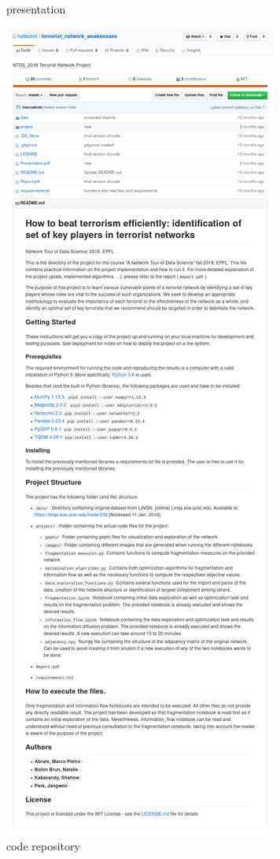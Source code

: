 \documentclass[aspectratio=169]{beamer}
\begin{document}
\begin{frame}
\begin{minipage}[t]{0.45\linewidth}
\begin{figure}
			\caption*{\color{darkred} presentation}
		\end{figure}
	\end{minipage}
	\hfill
	\begin{minipage}[t]{0.45\linewidth}
		\begin{figure}
			\includegraphics[width=\linewidth,trim={0 17.3cm 0 0},clip]{project_27_github}
			\caption*{\color{darkred} code repository}
		\end{figure}
	\end{minipage}
\end{frame}
\end{document}
